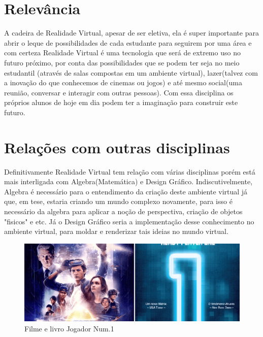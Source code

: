 \documentclass{paper}
\begin{document}
\section{Relevância}
A cadeira de Realidade Virtual, apesar de ser eletiva, ela é super importante para abrir o leque de possibilidades de cada estudante para seguirem por uma área e com certeza Realidade Virtual é uma tecnologia que será de extremo uso no futuro próximo, por conta das possibilidades que se podem ter seja no meio estudantil\cite{Fonte2} (através de salas compostas em um ambiente virtual), lazer(talvez com a inovação do que conhecemos de cinemas ou jogos) e até mesmo social\cite{Fonte}(uma reunião, conversar e interagir com outras pessoas). Com essa disciplina os próprios alunos de hoje em dia podem ter a imaginação para construir este futuro. 
\section{Relações com outras disciplinas}
Definitivamente Realidade Virtual tem relação com várias disciplinas porém está mais interligada com Algebra(Matemática) e Design Gráfico. Indiscutivelmente, Algebra é necessário para o entendimento da criação deste ambiente virtual já que, em tese, estaria criando um mundo complexo novamente, para isso é necessário da algebra para aplicar a noção de perspectiva, criação de objetos "fisicos" e etc. Já o Design Gráfico seria a implementação desse conhecimento no ambiente virtual, para moldar e renderizar tais ideias no mundo virtual.
\begin{figure}[h!]
\centering
\includegraphics[scale=0.24]{Jogador.png}
\caption{Filme e livro Jogador Num.1\cite{Fonte3}}
\end{figure}



\end{document}
